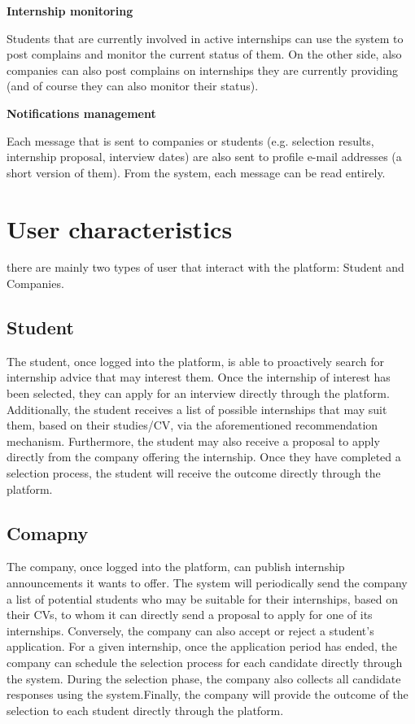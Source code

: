 		\textbf{Internship monitoring}
			\begin{flushleft}
				Students that are currently involved in active internships can use the system to post complains and monitor the current status of them. On the other side, also companies can also post complains on internships they are currently providing (and of course they can also monitor their status).
			\end{flushleft}
		\textbf{Notifications management}
			\begin{flushleft}
				Each message that is sent to companies or students (e.g. selection results, internship proposal, interview dates) are also sent to profile e-mail addresses (a short version of them). From the system, each message can be read entirely.
			\end{flushleft}
	\section{User characteristics}
		there are mainly two types of user that interact with the platform: Student and Companies.
		\subsection{Student}
			The student, once logged into the platform, is able to proactively search for internship advice that may interest them. Once the internship of interest has been selected, they can apply for an interview directly through the platform. Additionally, the student receives a list of possible internships that may suit them, based on their studies/CV, via the aforementioned recommendation mechanism. Furthermore, the student may also receive a proposal to apply directly from the company offering the internship. Once they have completed a selection process, the student will receive the outcome directly through the platform.
		
		\subsection{Comapny}
			The company, once logged into the platform, can publish internship announcements it wants to offer. The system will periodically send the company a list of potential students who may be suitable for their internships, based on their CVs, to whom it can directly send a proposal to apply for one of its internships. Conversely, the company can also accept or reject a student's application. For a given internship, once the application period has ended, the company can schedule the selection process for each candidate directly through the system. During the selection phase, the company also collects all candidate responses using the system.Finally, the company will provide the outcome of the selection to each student directly through the platform.
		
